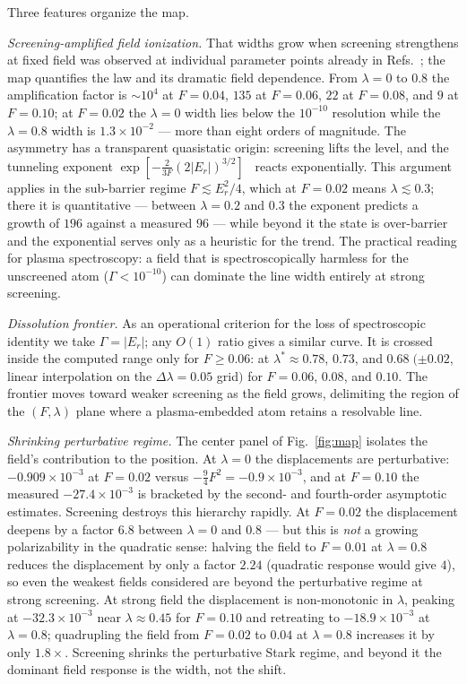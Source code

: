 \documentclass[aps,pra,twocolumn,superscriptaddress,floatfix,longbibliography]{revtex4-2}
\begin{document}
Three features organize the map.

\emph{Screening-amplified field ionization.} That widths grow when
screening strengthens at fixed field was observed at individual
parameter points already in Refs.~\cite{YuHo2005,LinHo2011}; the map
quantifies the law and its dramatic field dependence. From
$\lambda=0$ to $0.8$ the amplification factor is $\sim\!10^{4}$ at
$F=0.04$, $135$ at $F=0.06$, $22$ at $F=0.08$, and $9$ at $F=0.10$;
at $F=0.02$ the $\lambda=0$ width lies below the $10^{-10}$
resolution while the $\lambda=0.8$ width is $1.3\times10^{-2}$ ---
more than eight orders of magnitude. The asymmetry has a transparent
quasistatic origin: screening lifts the level, and the tunneling
exponent $\exp[-\tfrac{2}{3F}(2|E_r|)^{3/2}]$~\cite{
DamburgKolosov1976} reacts exponentially. This argument applies in
the sub-barrier regime $F\lesssim E_r^{2}/4$, which at $F=0.02$ means
$\lambda\lesssim0.3$; there it is quantitative --- between
$\lambda=0.2$ and $0.3$ the exponent predicts a growth of $196$
against a measured $96$ --- while beyond it the state is over-barrier
and the exponential serves only as a heuristic for the trend. The
practical reading for plasma spectroscopy: a field that is
spectroscopically harmless for the unscreened atom
($\Gamma<10^{-10}$) can dominate the line width entirely at strong
screening.

\emph{Dissolution frontier.} As an operational criterion for the
loss of spectroscopic identity we take $\Gamma=|E_r|$; any $O(1)$
ratio gives a similar curve. It is crossed inside the computed range
only for $F\geq0.06$: at $\lambda^{*}\approx0.78$, $0.73$, and
$0.68\;(\pm0.02$, linear interpolation on the $\Delta\lambda=0.05$
grid$)$ for $F=0.06$, $0.08$, and $0.10$. The frontier moves toward
weaker screening as the field grows, delimiting the region of the
$(F,\lambda)$ plane where a plasma-embedded atom retains a
resolvable line.

\emph{Shrinking perturbative regime.} The center panel of
Fig.~\ref{fig:map} isolates the field's contribution to the
position. At $\lambda=0$ the displacements are perturbative:
$-0.909\times10^{-3}$ at $F=0.02$ versus $-\tfrac94F^{2}=
-0.9\times10^{-3}$, and at $F=0.10$ the measured
$-27.4\times10^{-3}$ is bracketed by the second- and fourth-order
asymptotic estimates. Screening destroys this hierarchy rapidly. At
$F=0.02$ the displacement deepens by a factor $6.8$ between
$\lambda=0$ and $0.8$ --- but this is \emph{not} a growing
polarizability in the quadratic sense: halving the field to $F=0.01$
at $\lambda=0.8$ reduces the displacement by only a factor $2.24$
(quadratic response would give $4$), so even the weakest fields
considered are beyond the perturbative regime at strong screening.
At strong field the displacement is non-monotonic in $\lambda$,
peaking at $-32.3\times10^{-3}$ near $\lambda\approx0.45$ for
$F=0.10$ and retreating to $-18.9\times10^{-3}$ at $\lambda=0.8$;
quadrupling the field from $F=0.02$ to $0.04$ at $\lambda=0.8$
increases it by only $1.8\times$. Screening shrinks the perturbative
Stark regime, and beyond it the dominant field response is the
width, not the shift.
\end{document}

